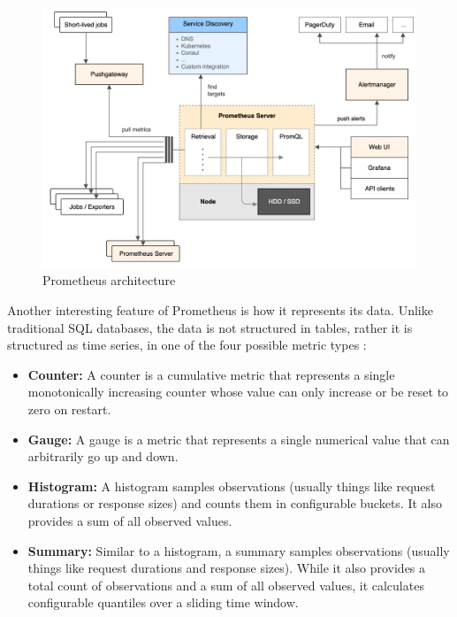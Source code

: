 \begin{figure}
    \centering
    \includegraphics[width=\textwidth]{gfx/prometheus_architecture.png}
    \caption{Prometheus architecture}
    \label{fig:prometheus_architecture}
\end{figure}

Another interesting feature of Prometheus is how it represents its data. Unlike traditional SQL databases, the data is not structured in tables, rather it is structured as time series, in one of the four possible metric types \cite{prometheus_metrics}:
\begin{itemize}
    \item \textbf{Counter: }A counter is a cumulative metric that represents a single monotonically increasing counter whose value can only increase or be reset to zero on restart.
    \item \textbf{Gauge: }A gauge is a metric that represents a single numerical value that can arbitrarily go up and down.
    \item \textbf{Histogram: }A histogram samples observations (usually things like request durations or response sizes) and counts them in configurable buckets. It also provides a sum of all observed values.
    \item \textbf{Summary: }Similar to a histogram, a summary samples observations (usually things like request durations and response sizes). While it also provides a total count of observations and a sum of all observed values, it calculates configurable quantiles over a sliding time window.
\end{itemize}

